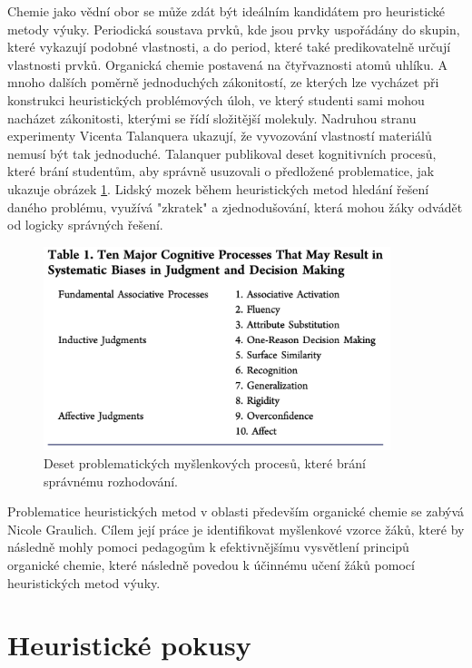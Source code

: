 Chemie jako vědní obor se může zdát být ideálním kandidátem pro heuristické metody výuky. Periodická soustava prvků, kde jsou prvky uspořádány do skupin, které vykazují podobné vlastnosti, a do period, které také predikovatelně určují vlastnosti prvků. Organická chemie postavená na čtyřvaznosti atomů uhlíku. A mnoho dalších poměrně jednoduchých zákonitostí, ze kterých lze vycházet při konstrukci heuristických problémových úloh, ve který studenti sami mohou nacházet zákonitosti, kterými se řídí složitější molekuly. Nadruhou stranu experimenty Vicenta Talanquera ukazují, že vyvozování vlastností materiálů nemusí být tak jednoduché. Talanquer publikoval deset kognitivních procesů, které brání studentům, aby správně usuzovali o předložené problematice, jak ukazuje obrázek \ref{fig:talanquer}. Lidský mozek během heuristických metod hledání řešení daného problému, využívá "zkratek" a zjednodušování, která mohou žáky odvádět od logicky správných řešení. \cite{talanquer2014}

    \begin{figure}[h!]
        \centering
        \includegraphics[width=0.9\textwidth]{pictures/systematic_biases.png}
        \caption{Deset problematických myšlenkových procesů, které brání správnému rozhodování. \cite{talanquer2014}}
        \label{fig:talanquer}
    \end{figure}{}
    

Problematice heuristických metod v oblasti především organické chemie se zabývá Nicole Graulich. Cílem její práce je identifikovat myšlenkové vzorce žáků, které by následně mohly pomoci pedagogům k efektivnějšímu vysvětlení principů organické chemie, které následně povedou k účinnému učení žáků pomocí heuristických metod výuky. \cite{graulich2010, graulich2012}\\

\section{Heuristické pokusy}

